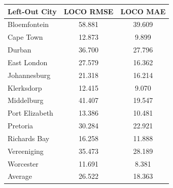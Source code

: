 \begin{tabular}{lcc}
\toprule
Left-Out City & LOCO RMSE & LOCO MAE \\ \midrule
Bloemfontein & 58.881 & 39.609 \\
Cape Town & 12.873 & 9.899 \\
Durban & 36.700 & 27.796 \\
East London & 27.579 & 16.362 \\
Johannesburg & 21.318 & 16.214 \\
Klerksdorp & 12.415 & 9.070 \\
Middelburg & 41.407 & 19.547 \\
Port Elizabeth & 13.386 & 10.481 \\
Pretoria & 30.284 & 22.921 \\
Richards Bay & 16.258 & 11.888 \\
Vereeniging & 35.473 & 28.189 \\
Worcester & 11.691 & 8.381 \\
Average & 26.522 & 18.363 \\
\bottomrule
\end{tabular}
